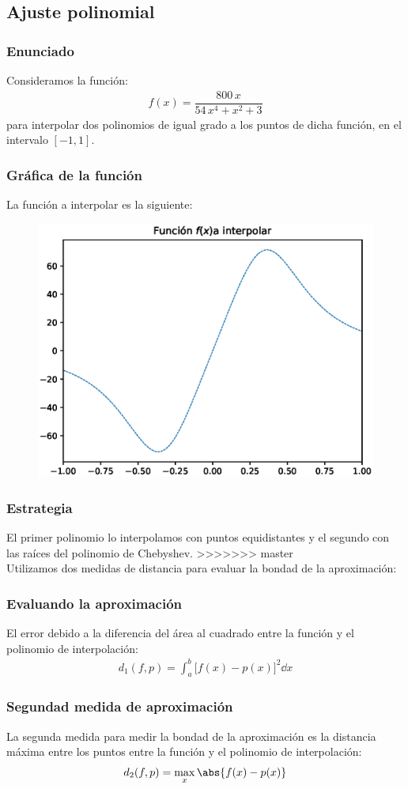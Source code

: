 \subsection{Ajuste polinomial}
\begin{frame}
\frametitle{Enunciado}
Consideramos la función:
\begin{align*}
f(x) = \dfrac{800 \, x}{54 \, x^{4} + x^{2} + 3}
\end{align*}
para interpolar dos polinomios de igual grado a los puntos de dicha función, en el intervalo $[-1, 1]$.
\end{frame}
\begin{frame}
\frametitle{Gráfica de la función}
La función a interpolar es la siguiente:
\begin{figure}
    \centering
    \includegraphics[scale=0.5]{Imagenes/Plot_Ejercicio_Chebychev_01.eps}
\end{figure}
\end{frame}
\begin{frame}
\frametitle{Estrategia} 
El primer polinomio lo interpolamos con puntos equidistantes y el segundo con las raíces del polinomio de Chebyshev.
>>>>>>> master
\\
\bigskip
\pause
Utilizamos dos medidas de distancia para evaluar la bondad de la aproximación:
\end{frame}
\begin{frame}
\frametitle{Evaluando la aproximación}
El error debido a la diferencia del área al cuadrado entre la función y el polinomio de interpolación:
\begin{align*}
d_{1} (f, p) = \int_{a}^{b} \big[ f(x) - p(x) \big]^{2} \dd{x}
\end{align*}
\end{frame}
\begin{frame}
\frametitle{Segundad medida de aproximación}
La segunda medida para medir la bondad de la aproximación es la distancia máxima entre los puntos entre la función y el polinomio de interpolación:
\begin{align*}
d_{2} (f, p) = \max_{x} \abs{f(x) - p(x)}
\end{align*}
\end{frame}
